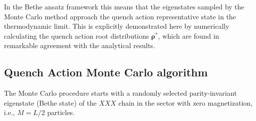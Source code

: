 \documentclass[11pt]{iopart}
\begin{document}
In the Bethe ansatz framework this means that the eigenstates sampled by the Monte 
Carlo method approach the quench action representative state in the thermodynamic 
limit. This is explicitly demonstrated here by numerically calculating the 
quench action root distributions $\pmb{\rho}^*$, which are found in remarkable 
agreement with the analytical results. 



\subsection{Quench Action Monte Carlo algorithm}
\label{sec:6.1}


The Monte Carlo procedure starts with a randomly selected parity-invariant 
eigenstate (Bethe state) of the $XXX$ chain in the sector with zero magnetization, 
i.e., $M=L/2$ particles. 
\end{document}
